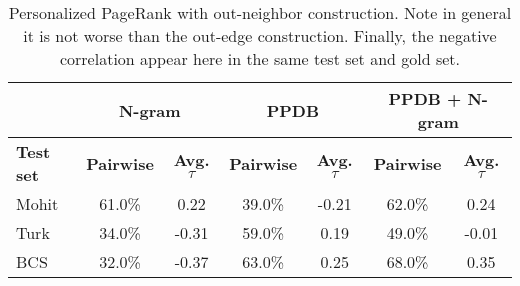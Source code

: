 \begin{table}
\small
\centering
\begin{tabular}{|l|cc|cc|cc|}
	\hline 
	& \multicolumn{2}{c|}{N-gram} 
	& \multicolumn{2}{c|}{PPDB} 
	& \multicolumn{2}{c|}{PPDB + N-gram} \\
	\hline 
	\bf Test set
	& \bf Pairwise & \bf Avg. $\tau$  
	& \bf Pairwise & \bf Avg. $\tau$  
	& \bf Pairwise & \bf Avg. $\tau$  \\ 
	\hline
	Mohit & 61.0\% &  0.22 & 39.0\%  & -0.21  & 62.0\% &  0.24 \\
	Turk  & 34.0\% & -0.31 & 59.0\%  &  0.19  & 49.0\% & -0.01 \\
	BCS   & 32.0\% & -0.37 & 63.0\%  &  0.25  & 68.0\% &  0.35 \\
	\hline
\end{tabular}
\caption{\label{font-table} Personalized PageRank with out-neighbor construction. Note in general it is not worse than the out-edge construction. Finally, the negative correlation appear here in the same test set and gold set. }
\end{table}


































